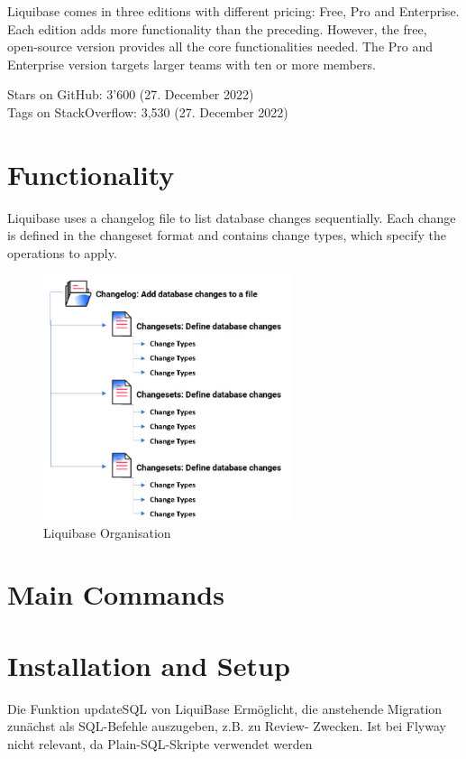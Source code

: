 %
Liquibase \cite{Liquibase} comes in three editions with different pricing: Free, Pro and Enterprise. Each edition adds more functionality than the preceding. However, the free, open-source version provides all the core functionalities needed. The Pro and Enterprise version targets larger teams with ten or more members. 

%
Stars on GitHub: 3'600 (27. December 2022)\\
Tags on StackOverflow: 3,530 (27. December 2022)\\

\section{Functionality}
%
Liquibase uses a changelog file to list database changes sequentially. Each change is defined in the changeset format and contains change types, which specify the operations to apply.

\begin{figure}[H]
	\centering
	\includegraphics[width=0.65\textwidth]{./chapters/intro_liquibase/images/changelog-structure.png}
	\caption[Liquibase Organisation - Source: \cite{Liquibase}]{Liquibase Organisation}
	\label{fig:IntroductionToLiquibase:LiquibaseChangelogStructure}
\end{figure}


\section{Main Commands}

\section{Installation and Setup}
Die Funktion updateSQL von LiquiBase
Ermöglicht, die anstehende Migration zunächst als SQL-Befehle auszugeben, z.B. zu Review- Zwecken.
Ist bei Flyway nicht relevant, da Plain-SQL-Skripte verwendet werden


\newpage